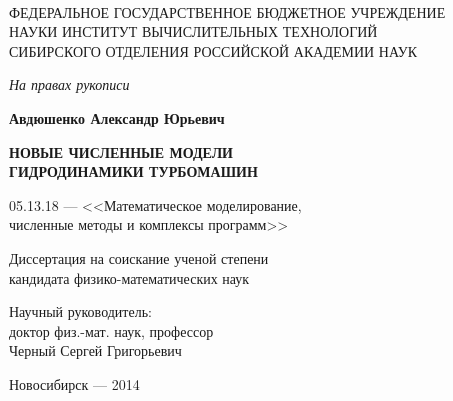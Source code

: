 \begin{titlepage}

\ \vspace{-5mm}
\begin{center}
  ФЕДЕРАЛЬНОЕ ГОСУДАРСТВЕННОЕ БЮДЖЕТНОЕ УЧРЕЖДЕНИЕ \\
  НАУКИ ИНСТИТУТ ВЫЧИСЛИТЕЛЬНЫХ ТЕХНОЛОГИЙ  \\
  СИБИРСКОГО ОТДЕЛЕНИЯ РОССИЙСКОЙ АКАДЕМИИ НАУК \\
\end{center}
\large
\vspace{10mm}
\begin{flushright}
  \textit{На правах рукописи}
\end{flushright}

\vspace{10mm}
\begin{center}
\textbf{ Авдюшенко Александр Юрьевич}

\vspace{10mm}
\textbf{НОВЫЕ ЧИСЛЕННЫЕ МОДЕЛИ \\ \vspace{-3mm}
        ГИДРОДИНАМИКИ ТУРБОМАШИН}

\vspace{10mm}
05.13.18 --- <<Математическое моделирование, \\ \vspace{-3mm}
численные методы и комплексы программ>>

\vspace{10mm}
Диссертация на соискание ученой степени \\ \vspace{-3mm}
кандидата физико-математических наук
\end{center}

\vspace{10mm}
\begin{flushright}
  \vbox{Научный руководитель:\\ \vspace{-3mm}
        доктор физ.-мат. наук, профессор\\ \vspace{-3mm}
        Черный Сергей Григорьевич}
\end{flushright}

\vfill
\begin{center}
  Новосибирск --- 2014
\end{center}
\end{titlepage}